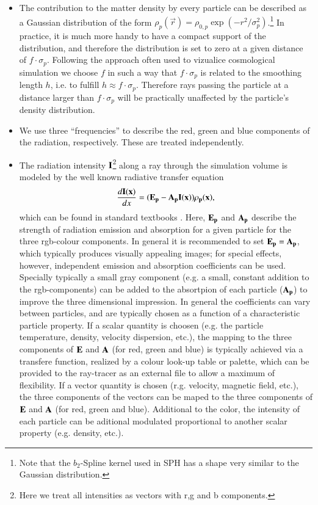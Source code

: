\begin{itemize}
\item The contribution to the matter density by every particle can
be described as a Gaussian distribution of the form 
$\rho_p(\vec r)=\rho_{0,p}\exp(-r^2/\sigma_p^2)$.\footnote{Note that the
$b_2$-Spline kernel used in SPH has a shape very similar to the Gaussian distribution.} In
practice, it is much more handy to have a compact support of the
distribution, and therefore the distribution is set to zero at a given
distance of $f\cdot\sigma_p$. Following the approach often used to vizualice 
cosmological simulation we choose $f$ in such a way that
$f\cdot\sigma_p$ is related to the smoothing length $h$, i.e.
to fulfill $h \approx f\cdot\sigma_p$. Therefore rays passing
the particle at a distance larger than $f\cdot\sigma_p$ will be practically
unaffected by the particle's density distribution.
\item We use three ``frequencies'' to describe the red, green and blue
components of the radiation, respectively. These are treated independently.
\item The radiation intensity $\bf{I}$\footnote{Here we treat all
intensities as vectors with r,g and b components.} along a ray through the simulation
volume is modeled by the well known radiative transfer equation
\begin{equation}
\frac{d\bf{I}(x)}{dx}=(\bf{E}_p-\bf{A}_p\bf{I}(x))\rho_p(x),
\end{equation}
which can be found in standard textbooks \cite{1991par..book.....S}.
Here, $\bf{E}_p$ and $\bf{A}_p$ describe the strength of radiation emission and absorption
for a given particle for the three rgb-colour components. In general it is recommended to
set $\bf{E}_p=\bf{A}_p$, which typically produces visually appealing images; for special
effects, however, independent emission and absorption coefficients can be used. Specially typically
a small gray component (e.g. a small, constant addition to the rgb-components) can be added 
to the absortpion of each particle ($\bf{A}_p$) to improve the three dimensional impression.
In general the coefficients can vary between particles, and are typically chosen as a function 
of a characteristic particle property. If a scalar quantity is choosen (e.g. the particle temperature, 
density, velocity dispersion, etc.), the mapping to the three components of $\bf{E}$ and $\bf{A}$ (for red, green and blue)
is typically achieved via a transfere function, realized by a colour look-up table or palette, which can
be provided to the ray-tracer as an external file to allow a maximum of flexibility. If a
vector quantity is chosen (r.g. velocity, magnetic field, etc.), the three components of the vectors
can be maped to the three components of $\bf{E}$ and $\bf{A}$ (for red, green and blue). Additional 
to the color, the intensity of each particle can be aditional modulated proportional to another
scalar property (e.g. density, etc.).
\end{itemize}

